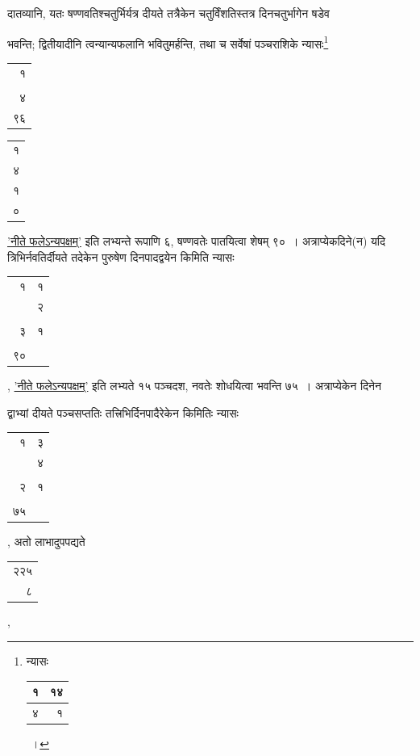 \documentclass[10pt, openany]{book}
\begin{document}
{{
{दातव्यानि, यतः षण्णवतिश्चतुर्भिर्यत्र दीयते तत्रैकेन चतुर्विंशतिस्तत्र
दिनचतुर्भागेन षडेव}
{भवन्ति; द्वितीयादीनि त्वन्यान्यफलानि भवितुमर्हन्ति, तथा च सर्वेषां
पञ्चराशिके न्यासः\renewcommand{\thefootnote}{\s ९}\footnote{\s न्यासः\,\begin{tabular}{r|r|}
१ & १४\\
\hline 
 ४ &  १ \\
 \hline
\end{tabular}~।}\begin{tabular}{r|}१\\ \\ ४\\ ९६ \end{tabular}\begin{tabular}{r}१\\ ४\\ १\\ ०\end{tabular}\hyperref[45]{'नीते फलेऽन्यपक्षम्'} इति लभ्यन्ते रूपाणि ६, षण्णवतेः
पातयित्वा शेषम् ९०~। अत्राप्येकदिने(न) यदि त्रिभिर्नवतिर्दीयते तदेकेन पुरुषेण दिनपादद्वयेन किमिति
न्यासः \begin{tabular}{r | r}
१ & १ \\
{} &  २ \\
\hline \\
 ३ &  १ \\
\hline\\
 ९० & {}
\end{tabular}, \hyperref[45]{'नीते फलेऽन्यपक्षम्'} इति लभ्यते १५ पञ्चदश, नवतेः शोधयित्वा भवन्ति ७५~।
अत्राप्येकेन दिनेन}
{द्वाभ्यां दीयते पञ्चसप्ततिः तत्त्रिभिर्दिनपादैरेकेन किमितिः न्यासः \begin{tabular}{r|r}
  १   & ३ \\
  {}   &  ४ \\
  \hline \\
  २ & १ \\
  \hline \\
 ७५ & {} 
\end{tabular}, अतो लाभादुपपद्यते\begin{tabular}{r}२२५\\ ८\end{tabular},}

\newpage

}}
\end{document}
